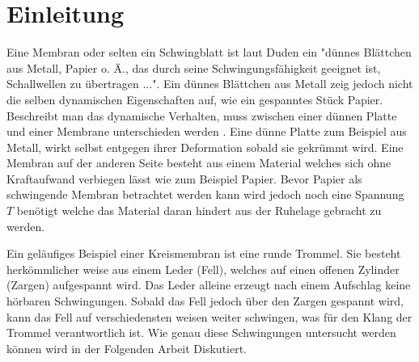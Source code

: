 %
%
%
\section{Einleitung\label{kreismembran:section:teil0}}
Eine Membran oder selten ein Schwingblatt ist laut Duden \cite{kreismembran:Duden:Membran} ein "dünnes Blättchen aus Metall, Papier o. Ä., das durch seine Schwingungsfähigkeit geeignet ist, Schallwellen zu übertragen ...". 
Ein dünnes Blättchen aus Metall zeig jedoch nicht die selben dynamischen Eigenschaften auf, wie ein gespanntes Stück Papier. 
Beschreibt man das dynamische Verhalten, muss zwischen einer dünnen Platte und einer Membrane unterschieden werden \cite{kreismembran:membrane_vs_thin_plate}. 
Eine dünne Platte zum Beispiel aus Metall, wirkt selbst entgegen ihrer Deformation sobald sie gekrümmt wird. 
Eine Membran auf der anderen Seite besteht aus einem Material welches sich ohne Kraftaufwand verbiegen lässt wie zum Beispiel Papier. 
Bevor Papier als schwingende Membran betrachtet werden kann wird jedoch noch eine Spannung $ T $ benötigt welche das Material daran hindert aus der Ruhelage gebracht zu werden. 

Ein geläufiges Beispiel einer Kreismembran ist eine runde Trommel. 
Sie besteht herkömmlicher weise aus einem Leder (Fell), welches auf einen offenen Zylinder (Zargen) aufgespannt wird. 
Das Leder alleine erzeugt nach einem Aufschlag keine hörbaren Schwingungen. 
Sobald das Fell jedoch über den Zargen gespannt wird, kann das Fell auf verschiedensten weisen weiter schwingen, was für den Klang der Trommel verantwortlich ist. 
Wie genau diese Schwingungen untersucht werden können wird in der Folgenden Arbeit Diskutiert.


